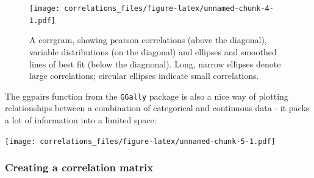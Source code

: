 \documentclass[]{article}
\newenvironment{Shaded}{\begin{snugshade}}{\end{snugshade}}
\newcommand{\DataTypeTok}[1]{\textcolor[rgb]{0.13,0.29,0.53}{#1}}
\newcommand{\KeywordTok}[1]{\textcolor[rgb]{0.13,0.29,0.53}{\textbf{#1}}}
\newcommand{\NormalTok}[1]{#1}
\newcommand{\OperatorTok}[1]{\textcolor[rgb]{0.81,0.36,0.00}{\textbf{#1}}}
\newcommand{\StringTok}[1]{\textcolor[rgb]{0.31,0.60,0.02}{#1}}
\begin{document}
\begin{Shaded}
\end{Shaded}

\begin{figure}
\centering
\texttt{[image: correlations\_files/figure-latex/unnamed-chunk-4-1.pdf]}
\caption{\label{fig:unnamed-chunk-4}A corrgram, showing pearson correlations (above the diagonal), variable distributions (on the diagonal) and ellipses and smoothed lines of best fit (below the diagnonal). Long, narrow ellipses denote large correlations; circular ellipses indicate small correlations.}
\end{figure}

The ggpairs function from the \texttt{GGally} package is also a nice way of plotting
relationships between a combination of categorical and continuous data - it
packs a lot of information into a limited space:

\begin{Shaded}
\end{Shaded}

\texttt{[image: correlations\_files/figure-latex/unnamed-chunk-5-1.pdf]}

\hypertarget{correlation-matrix}{%
\subsubsection*{Creating a correlation matrix}\label{correlation-matrix}}
\end{document}
